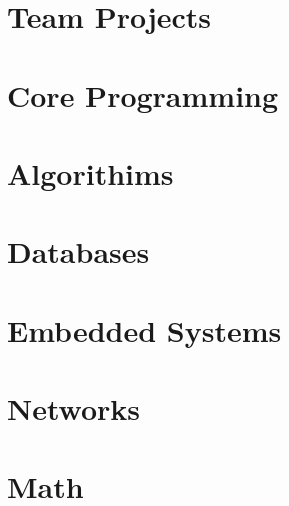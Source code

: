 \section{Team Projects}
\hypertarget{cat:team}{}
\newpage








\section{Core Programming}
\hypertarget{cat:programming}{}




\section{Algorithims}
\hypertarget{cat:algo}{}



\section{Databases}
\hypertarget{cat:database}{}





\section{Embedded Systems}
\hypertarget{cat:embedded}{}




\section{Networks}
\hypertarget{cat:network}{}



\section{Math}
\hypertarget{cat:math}{}












